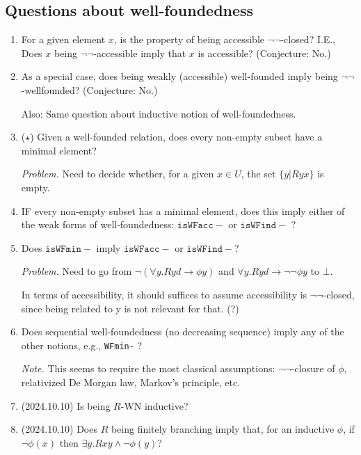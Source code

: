 \documentclass{scrartcl}
\begin{document}
\subsection{Questions about well-foundedness}

\begin{enumerate}
  \item For a given element $x$, is the property of
  being accessible $\lnot\lnot$-closed? I.E.,
  Does $x$ being $\lnot\lnot$-accessible imply that $x$ is accessible?
  (Conjecture: No.)

  \item As a special case, does being weakly (accessible) well-founded imply being $\lnot\lnot$-wellfounded?
  (Conjecture: No.)

  Also: Same question about inductive notion of well-foundedness.

  \item ($\star$) Given a well-founded relation, does every non-empty subset
  have a minimal element?

  \emph{Problem.} Need to decide whether, for a given $x \in U$,
   the set $\{y | Ryx\}$ is empty.

   \item IF every non-empty subset has a minimal element, does this imply
   either of the weak forms of well-foundedness: $\mathtt{isWFacc-}$ or
   $\mathtt{isWFind-}$ ?

   \item Does $\mathtt{isWFmin-}$ imply $\mathtt{isWFacc-}$ or $\mathtt{isWFind-}$?

   \emph{Problem.} Need to go from $\lnot (\forall y. R y d \to \phi y)$
   and $\forall y. R y d \to \lnot \lnot \phi y$ to $\bot$.

   In terms of accessibility, it should suffices to assume accessibility is
   $\lnot\lnot$-closed, since being related to y is not relevant for that. (?)

   \item Does sequential well-foundedness (no decreasing sequence) imply
   any of the other notions, e.g., \texttt{WFmin-} ?

   \emph{Note.}  This seems to require the most classical assumptions:
   $\lnot\lnot$-closure of $\phi$, relativized De Morgan law,
   Markov's principle, etc.

   \item (2024.10.10) Is being $R$-WN inductive?
   \item (2024.10.10) Does $R$ being finitely branching imply
   that, for an inductive $\phi$, if $\lnot \phi(x)$ then
   $\exists y. Rxy \land \lnot \phi(y)$?

\end{enumerate}
\end{document}

